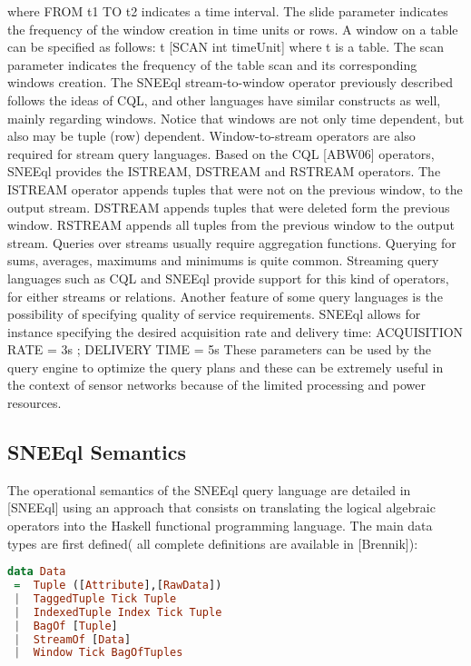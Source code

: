 where \textsf{FROM t1 TO t2} indicates a time interval. The slide parameter indicates the frequency of the window creation in time units or rows.
A window on a table can be specified as follows:
\textsf{t [SCAN int timeUnit]}
where t is a table. The scan parameter indicates the frequency of the table scan and its corresponding windows creation.
The SNEEql stream-to-window operator previously described follows the ideas of CQL, and other languages have similar constructs as well, mainly regarding windows. Notice that windows are not only time dependent, but also may be tuple (row) dependent.
Window-to-stream operators are also required for stream query languages. Based on the CQL [ABW06] operators, SNEEql provides the ISTREAM, DSTREAM and RSTREAM operators. The ISTREAM operator appends tuples that were not on the previous window, to the output stream. DSTREAM appends tuples that were deleted form the previous window. RSTREAM appends all tuples from the previous window to the output stream.
Queries over streams usually require aggregation functions. Querying for sums, averages, maximums and minimums is quite common. Streaming query languages such as CQL and SNEEql provide support for this kind of operators, for either streams or relations.
Another feature of some query languages is the possibility of specifying quality of service requirements. SNEEql allows for instance specifying the desired acquisition rate and delivery time:
\textsf{ACQUISITION RATE = 3s ; DELIVERY TIME = 5s}
These parameters can be used by the query engine to optimize the query plans and these can be extremely useful in the context of sensor networks because of the limited processing and power resources.


\subsection{SNEEql Semantics}
\label{sneeqlsemantics}

The operational semantics of the SNEEql query language are detailed in [SNEEql] using an approach that consists on translating the logical algebraic operators into the Haskell functional programming language. 
The main data types are first defined( all complete definitions are available in [Brennik]):


\begin{lstlisting}[style=HaskellSNEE,language=Haskell,frame=none]
data Data
 =	Tuple ([Attribute],[RawData])
 |	TaggedTuple Tick Tuple
 |	IndexedTuple Index Tick Tuple
 |	BagOf [Tuple]
 |	StreamOf [Data]
 |	Window Tick BagOfTuples
\end{lstlisting}

